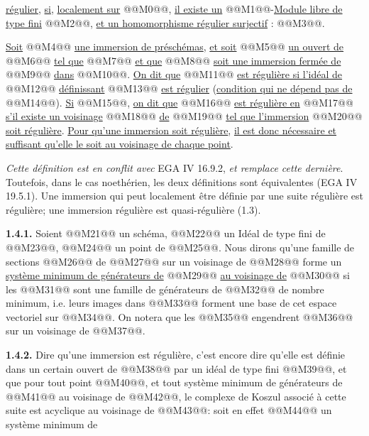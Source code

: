 
\uline{régulier}, \uline{si}, \uline{localement sur} @@M0@@, \uline{il existe un} @@M1@@-\uline{Module libre de type fini} @@M2@@, \uline{et un homomorphisme régulier surjectif} : @@M3@@.

\uline{Soit} @@M4@@ \uline{une immersion de préschémas}, \uline{et soit} @@M5@@ \uline{un ouvert de} @@M6@@ \uline{tel que} @@M7@@ \uline{et que} @@M8@@ \uline{soit une immersion fermée de} @@M9@@ \uline{dans} @@M10@@. \uline{On dit que} @@M11@@ \uline{est régulière si l'idéal de} @@M12@@ \uline{définissant} @@M13@@ \uline{est régulier} (\uline{condition qui ne dépend pas de} @@M14@@). \uline{Si} @@M15@@, \uline{on dit que} @@M16@@ \uline{est régulière en} @@M17@@ \uline{s'il existe un voisinage} @@M18@@ \uline{de} @@M19@@ \uline{tel que l'immersion} @@M20@@ \uline{soit régulière}. \uline{Pour qu'une immersion soit régulière}, \uline{il est donc nécessaire et suffisant qu'elle le soit au voisinage de chaque point}.

\emph{Cette définition est en conflit avec} EGA IV 16.9.2, \emph{et remplace cette dernière}. Toutefois, dans le cas noethérien, les deux définitions sont équivalentes (EGA IV 19.5.1). Une immersion qui peut localement être définie par une suite régulière est régulière; une immersion régulière est quasi-régulière (1.3).

\textbf{1.4.1.} Soient @@M21@@ un schéma, @@M22@@ un Idéal de type fini de @@M23@@, @@M24@@ un point de @@M25@@. Nous dirons qu'une famille de sections @@M26@@ de @@M27@@ sur un voisinage de @@M28@@ forme un \uline{système minimum de générateurs de} @@M29@@ \uline{au voisinage de} @@M30@@ si les @@M31@@ sont une famille de générateurs de @@M32@@ de nombre minimum, i.e. leurs images dans @@M33@@ forment une base de cet espace vectoriel sur @@M34@@. On notera que les @@M35@@ engendrent @@M36@@ sur un voisinage de @@M37@@.

\textbf{1.4.2.} Dire qu'une immersion est régulière, c'est encore dire qu'elle est définie dans un certain ouvert de @@M38@@ par un idéal de type fini @@M39@@, et que pour tout point @@M40@@, et tout système minimum de générateurs de @@M41@@ au voisinage de @@M42@@, le complexe de Koszul associé à cette suite est acyclique au voisinage de @@M43@@: soit en effet @@M44@@ un système minimum de
